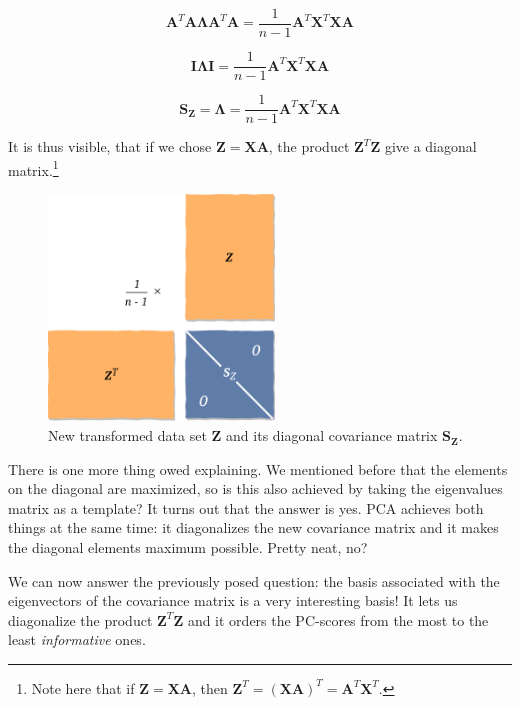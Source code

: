 \documentclass[10pt,twocolumn]{article}
\begin{document}
\begin{equation}
\bm{A}^T \bm{A} \bm{\Lambda} \bm{A}^T \bm{A} =  \frac{1}{n-1} \bm{A}^T  \bm{X}^T \bm{X} \bm{A}
\end{equation}

\begin{equation}
\bm{I} \bm{\Lambda} \bm{I} =  \frac{1}{n-1} \bm{A}^T  \bm{X}^T \bm{X} \bm{A}
\end{equation}

\begin{equation}
\bm{S_Z}  = \bm{\Lambda} = \frac{1}{n-1} \bm{A}^T  \bm{X}^T \bm{X} \bm{A}
\end{equation}

It is thus visible, that if we chose $\bm{Z} = \bm{X} \bm{A}$, the product $\bm{Z}^T \bm{Z}$ give a diagonal matrix.\footnote{Note here that if $\bm{Z} = \bm{X} \bm{A}$, then $\bm{Z}^T = (\bm{X} \bm{A})^T = \bm{A}^T \bm{X}^T$.}

\begin{figure}[H]
\centering\includegraphics[width=6cm]{PC-scores.png}
\caption{New transformed data set $\bm{Z}$ and its diagonal covariance matrix $\bm{S_Z}$.}
\label{fig:PC-scores}
\end{figure}

There is one more thing owed explaining. We mentioned before that the elements on the diagonal are maximized, so is this also achieved by taking the eigenvalues matrix as a template? It turns out that the answer is yes. PCA achieves both things at the same time: it diagonalizes the new covariance matrix and it makes the diagonal elements maximum possible. Pretty neat, no?

We can now answer the previously posed question: the basis associated with the eigenvectors of the covariance matrix is a very interesting basis! It lets us diagonalize the product $\bm{Z}^T \bm{Z}$ and it orders the PC-scores from the most to the least \textit{informative} ones.
\end{document}

